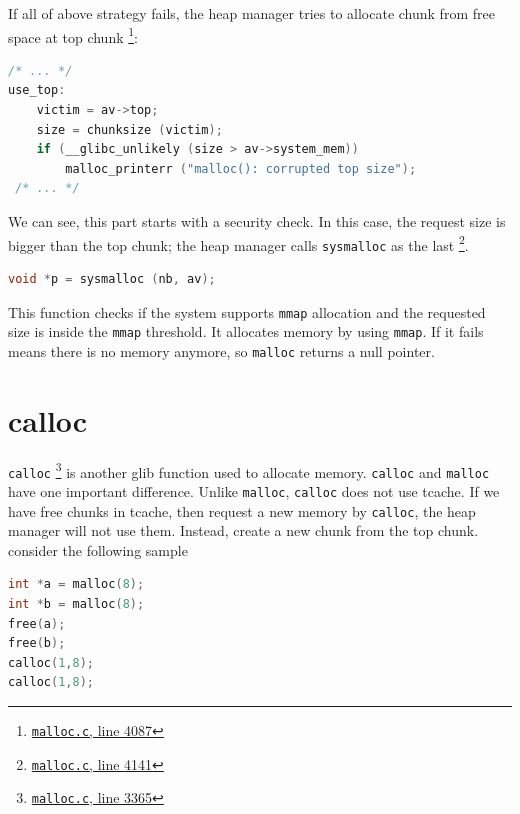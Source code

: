 \documentclass{masterthesis}
\newcommand*\tch{tcache}
\newcommand*\mallocc{\lstinline{malloc}}
\newcommand*\callocc{\lstinline{calloc}}
\newcommand*\mmapc{\lstinline{mmap}}
\begin{document}
If all of above strategy fails, the heap manager tries to allocate chunk from free space at top chunk \footnote{\href{https://sourceware.org/git/?p=glibc.git;a=blob;f=malloc/malloc.c;h=f7cd29bc2f93e1082ee77800bd64a4b2a2897055;hb=9ea3686266dca3f004ba874745a4087a89682617\#l4087}{\texttt{malloc.c}, line 4087}}:

\begin{lstlisting}[language=c,frame=tlrb]
 /* ... */
use_top:
	victim = av->top;
	size = chunksize (victim);
	if (__glibc_unlikely (size > av->system_mem))
		malloc_printerr ("malloc(): corrupted top size");
 /* ... */
\end{lstlisting}

We can see, this part starts with a security check. In this case, the request size is bigger than the top chunk; the heap manager calls \lstinline{sysmalloc} as the last \footnote{\href{https://sourceware.org/git/?p=glibc.git;a=blob;f=malloc/malloc.c;h=f7cd29bc2f93e1082ee77800bd64a4b2a2897055;hb=9ea3686266dca3f004ba874745a4087a89682617\#l4141}{\texttt{malloc.c}, line 4141}}.

\begin{lstlisting}[language=c,frame=tlrb]
 void *p = sysmalloc (nb, av);
 \end{lstlisting}

This function checks if the system supports \mmapc{} allocation and the requested size is inside the \mmapc{} threshold. It allocates memory by using \mmapc{}. If it fails means there is no memory anymore, so \mallocc{} returns a null pointer.

\section{calloc}
\callocc{} \footnote{\href{https://sourceware.org/git/?p=glibc.git;a=blob;f=malloc/malloc.c;h=f7cd29bc2f93e1082ee77800bd64a4b2a2897055;hb=9ea3686266dca3f004ba874745a4087a89682617\#l3365}{\texttt{malloc.c}, line 3365}} is another glib function used to allocate memory. \callocc{} and \mallocc{} have one important difference. Unlike \mallocc{}, \callocc{} does not use \tch{}. If we have free chunks in \tch{}, then request a new memory by \callocc{}, the heap manager will not use them. Instead, create a new chunk from the top chunk. consider the following sample

\begin{lstlisting}[language=c,frame=tlrb]
int *a = malloc(8);
int *b = malloc(8);
free(a);
free(b);
calloc(1,8);
calloc(1,8);
\end{lstlisting}
\end{document}

